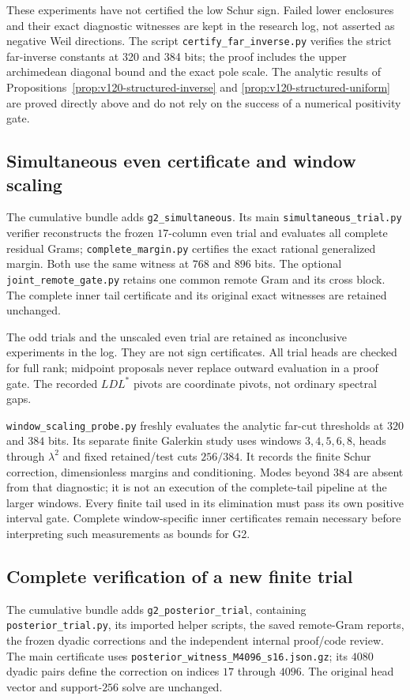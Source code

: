\documentclass[11pt]{article}
\theoremstyle{remark}
\begin{document}
These experiments have not certified the low Schur sign. Failed
lower enclosures and their exact diagnostic witnesses are kept in the
research log, not asserted as negative Weil directions. The script \texttt{certify\_far\_inverse.py} verifies the
strict far-inverse constants at 320 and 384 bits; the proof includes
the upper archimedean diagonal bound and the exact pole scale.
The analytic
results of Propositions~\ref{prop:v120-structured-inverse} and
\ref{prop:v120-structured-uniform} are proved directly above and
do not rely on the success of a numerical positivity gate.

\subsection*{Simultaneous even certificate and window scaling}
\label{app:v125-simultaneous}
The cumulative bundle adds \texttt{g2\_simultaneous}. Its main
\texttt{simultaneous\_trial.py} verifier reconstructs the frozen
$17$-column even trial and evaluates all complete residual Grams;
\texttt{complete\_margin.py} certifies the exact rational generalized
margin. Both use the same witness at $768$ and $896$ bits.
The optional \texttt{joint\_remote\_gate.py} retains one common
remote Gram and its cross block. The complete inner tail certificate
and its original exact witnesses are retained unchanged.

The odd trials and the unscaled even trial are retained as
inconclusive experiments in the log. They are not sign certificates.
All trial heads are checked for full rank; midpoint proposals never
replace outward evaluation in a proof gate. The recorded $LDL^*$
pivots are coordinate pivots, not ordinary spectral gaps.

\texttt{window\_scaling\_probe.py} freshly evaluates the analytic
far-cut thresholds at $320$ and $384$ bits. Its separate finite
Galerkin study uses windows $3,4,5,6,8$, heads through $\lambda^2$
and fixed retained/test cuts $256/384$. It records the finite
Schur correction, dimensionless margins and conditioning. Modes
beyond $384$ are absent from that diagnostic; it is not an execution
of the complete-tail pipeline at the larger windows. Every finite
tail used in its elimination must pass its own positive interval
gate. Complete window-specific inner certificates remain necessary
before interpreting such measurements as bounds for G2.

\subsection*{Complete verification of a new finite trial}
\label{app:v124-posterior}
The cumulative bundle adds \texttt{g2\_posterior\_trial}, containing
\nolinkurl{posterior_trial.py}, its imported helper scripts, the
saved remote-Gram reports, the frozen dyadic corrections and the
independent internal proof/code review. The main certificate uses
\nolinkurl{posterior_witness_M4096_s16.json.gz}; its $4080$ dyadic
pairs define the correction on indices $17$ through $4096$.
The original head vector and support-$256$ solve are unchanged.
\end{document}
